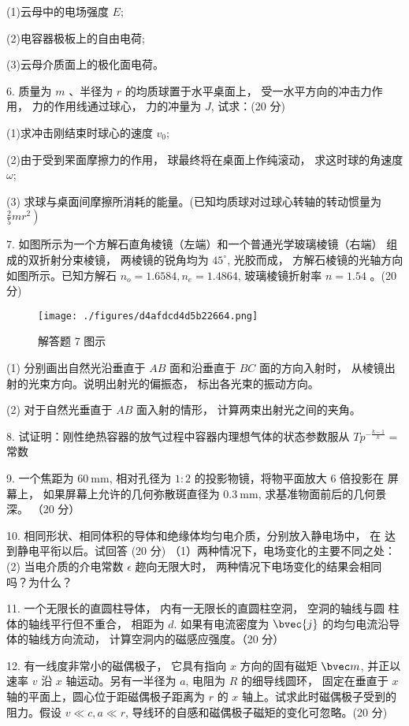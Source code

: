 (1)云母中的电场强度 $E$;

(2)电容器极板上的自由电荷;

(3)云母介质面上的极化面电荷。

6. 质量为 $m$ 、半径为 $r$ 的均质球置于水平桌面上， 受一水平方向的冲击力作用， 力的作用线通过球心， 力的冲量为 $J$, 试求：(20 分)

(1)求冲击刚结束时球心的速度 $v_{0}$;

(2)由于受到䍒面摩擦力的作用， 球最终将在桌面上作纯滚动， 求这时球的角速度 $\omega$;

(3) 求球与桌面间摩擦所消耗的能量。(已知均质球对过球心转轴的转动惯量为 $\left.\frac{2}{5} m r^{2}\right)$

7. 如图所示为一个方解石直角棱镜（左端）和一个普通光学玻璃棱镜（右端） 组成的双折射分束棱镜， 两棱镜的锐角均为 $45^{\circ}$, 光胶而成， 方解石棱镜的光轴方向如图所示。已知方解石 $n_{o}=1.6584, n_{e}=1.4864$, 玻璃棱镜折射率 $n=1.54$ 。(20 分)
\begin{figure}[ht]
\centering
\texttt{[image: ./figures/d4afdcd4d5b22664.png]}
\caption{解答题 7 图示} \label{fig_FDU15_3}
\end{figure}
(1) 分别画出自然光沿垂直于 $A B$ 面和沿垂直于 $B C$ 面的方向入射时， 从棱镜出射的光束方向。说明出射光的偏振态， 标出各光束的振动方向。

(2) 对于自然光垂直于 $A B$ 面入射的情形， 计算两束出射光之间的夹角。

8. 试证明：刚性绝热容器的放气过程中容器内理想气体的状态参数服从 $T p^{-\frac{k-1}{k}}=$ 常数

9. 一个焦距为 $60 \mathrm{~mm}$, 相对孔径为 $1: 2$ 的投影物镜，将物平面放大 $6$ 倍投影在 屏幕上， 如果屏幕上允许的几何弥散斑直径为 $0.3 \mathrm{~mm}$, 求基准物面前后的几何景深。
（20 分）

10. 相同形状、相同体积的导体和绝缘体均匀电介质，分别放入静电场中， 在 达到静电平衔以后。试回答
(20 分)
（1）两种情况下，电场变化的主要不同之处：
(2) 当电介质的介电常数 $\epsilon$ 趂向无限大时， 两种情况下电场变化的结果会相同吗？为什么？

11. 一个无限长的直圆柱导体， 内有一无限长的直圆柱空洞， 空洞的轴线与圆 柱体的轴线平行但不重合， 相距为 $d$. 如果有电流密度为 $\bvec{j}$ 的均匀电流沿导体的轴线方向流动， 计算空洞内的磁感应强度。（20 分）

12. 有一线度非常小的磁偶极子， 它具有指向 $x$ 方向的固有磁矩 $\bvec m$, 并正以速率 $v$ 沿 $x$ 轴运动。另有一半径为 $a$, 电阻为 $R$ 的细导线圆环， 固定在垂直于 $x$ 轴的平面上，圆心位于距磁偶极子距离为 $r$ 的 $x$ 轴上。试求此时磁偶极子受到的阻力。假设 $v \ll c, a \ll r$, 导线环的自感和磁偶极子磁矩的变化可忽略。(20 分)